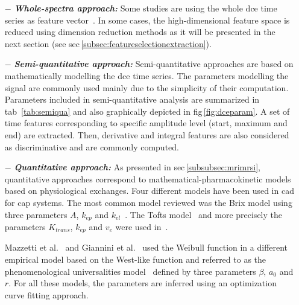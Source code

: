 \begin{enumerate}[leftmargin=*]

\item[$-$] \textbf{\textit{Whole-spectra approach:}} Some studies are using the whole \ac{dce} time series as feature vector~\cite{Ampeliotis2007,Ampeliotis2008,Tiwari2012,Viswanath2008a,Viswanath2008}. In some cases, the high-dimensional feature space is reduced using dimension reduction methods as it will be presented in the next section (see \ac{sec}\,\ref{subsec:featureselectionextraction}).

\item[$-$] \textbf{\textit{Semi-quantitative approach:}} Semi-quantitative approaches are based on mathematically modelling the \ac{dce} time series. The parameters modelling the signal are commonly used mainly due to the simplicity of their computation. Parameters included in semi-quantitative analysis are summarized in \ac{tab}~\ref{tab:semiqua} and also graphically depicted in \ac{fig}\,\ref{fig:dceparam}. A set of time features corresponding to specific amplitude level (start, maximum and end) are extracted. Then, derivative and integral features are also considered as discriminative and are commonly computed.

\item[$-$] \textbf{\textit{Quantitative approach:}} As presented in \ac{sec}\,\ref{subsubsec:mrimrsi}, quantitative approaches correspond to mathematical-pharmacokinetic models based on physiological exchanges. Four different models have been used in \ac{cad} for \ac{cap} systems. The most common model reviewed was the Brix model using three parameters $A$, $k_{ep}$ and $k_{el}$~\cite{Artan2009,Artan2010,Sung2011,Liu2009,Ozer2009,Ozer2010}. The Tofts model~\cite{Tofts1997} and more precisely the parameters $K_{trans}$, $k_{ep}$ and $v_e$ were used in~\cite{Langer2009,Litjens2011,Litjens2012,Litjens2014,Giannini2013,Niaf2011,Niaf2012,Mazzetti2011}.

  Mazzetti et al.~\cite{Mazzetti2011} and Giannini et al.~\cite{Giannini2013} used the Weibull function in a different empirical model based on the West-like function and referred to as the phenomenological universalities model~\cite{Castorina2006} defined by three parameters $\beta$, $a_0$ and $r$.
  For all these models, the parameters are inferred using an optimization curve fitting approach.

\end{enumerate}

